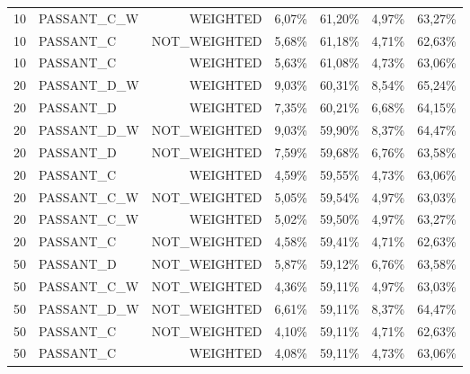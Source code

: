 \begin{table}[H]
{\begin{tabular}{ c l r c c c c }
		10 & PASSANT\_C\_W &   WEIGHTED &     6,07\% &    61,20\% &     4,97\% &    63,27\% \\
		
		10 &  PASSANT\_C & NOT\_WEIGHTED &     5,68\% &    61,18\% &     4,71\% &    62,63\% \\
		
		10 &  PASSANT\_C &   WEIGHTED &     5,63\% &    61,08\% &     4,73\% &    63,06\% \\
		
		20 & PASSANT\_D\_W &   WEIGHTED &     9,03\% &    60,31\% &     8,54\% &    65,24\% \\
		
		20 &  PASSANT\_D &   WEIGHTED &     7,35\% &    60,21\% &     6,68\% &    64,15\% \\
		
		20 & PASSANT\_D\_W & NOT\_WEIGHTED &     9,03\% &    59,90\% &     8,37\% &    64,47\% \\
		
		20 &  PASSANT\_D & NOT\_WEIGHTED &     7,59\% &    59,68\% &     6,76\% &    63,58\% \\
		
		20 &  PASSANT\_C &   WEIGHTED &     4,59\% &    59,55\% &     4,73\% &    63,06\% \\
		
		20 & PASSANT\_C\_W & NOT\_WEIGHTED &     5,05\% &    59,54\% &     4,97\% &    63,03\% \\
		
		20 & PASSANT\_C\_W &   WEIGHTED &     5,02\% &    59,50\% &     4,97\% &    63,27\% \\
		
		20 &  PASSANT\_C & NOT\_WEIGHTED &     4,58\% &    59,41\% &     4,71\% &    62,63\% \\
		
		50 &  PASSANT\_D & NOT\_WEIGHTED &     5,87\% &    59,12\% &     6,76\% &    63,58\% \\
		
		50 & PASSANT\_C\_W & NOT\_WEIGHTED &     4,36\% &    59,11\% &     4,97\% &    63,03\% \\
		
		50 & PASSANT\_D\_W & NOT\_WEIGHTED &     6,61\% &    59,11\% &     8,37\% &    64,47\% \\
		
		50 &  PASSANT\_C & NOT\_WEIGHTED &     4,10\% &    59,11\% &     4,71\% &    62,63\% \\
		
		50 &  PASSANT\_C &   WEIGHTED &     4,08\% &    59,11\% &     4,73\% &    63,06\% \\
		

\end{tabular}}
\end{table}
